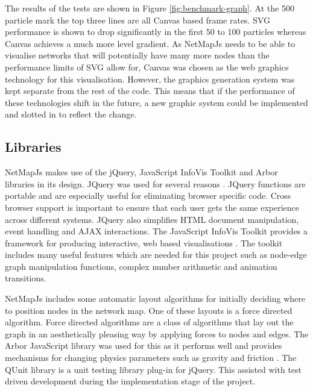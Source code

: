 \documentclass[11pt, a4paper]{article}
\begin{document}
The results of the tests are shown in Figure \ref{fig:benchmark-graph}. At the
500 particle mark the top three lines are all Canvas based frame rates. SVG
performance is shown to drop significantly in the first 50 to 100 particles
whereas Canvas achieves a much more level gradient. As NetMapJs needs to be
able to visualise networks that will potentially have many more nodes than the
performance limits of SVG allow for, Canvas was chosen as the web graphics
technology for this visualisation. However, the graphics generation system was
kept separate from the rest of the code. This means that if the performance of
these technologies shift in the future, a new graphic system could be
implemented and slotted in to reflect the change.


\subsection{Libraries}
\label{sec:libraries}

NetMapJs makes use of the jQuery, JavaScript InfoVis Toolkit and Arbor libraries
in its design. JQuery was used for several reasons \cite{jQuery_website}. JQuery
functions are portable and are especially useful for eliminating browser
specific code. Cross browser support is important to ensure that each user gets
the same experience across different systems. JQuery also simplifies HTML
document manipulation, event handling and AJAX interactions. The JavaScript
InfoVis Toolkit provides a framework for producing interactive, web based
visualisations \cite{thejit_website}. The toolkit includes many useful features
which are needed for this project such as node-edge graph manipulation
functions, complex number arithmetic and animation transitions.

NetMapJs includes some automatic layout algorithms for initially deciding where
to position nodes in the network map. One of these layouts is a force directed
algorithm. Force directed algorithms are a class of algorithms that lay out the
graph in an aesthetically pleasing way by applying forces to nodes and edges.
The Arbor JavaScript library was used for this as it performs well and provides
mechanisms for changing physics parameters such as gravity and friction
\cite{Arbor_website}. The QUnit library is a unit testing library plug-in for
jQuery. This assisted with test driven development during the implementation
stage of the project.
\end{document}
